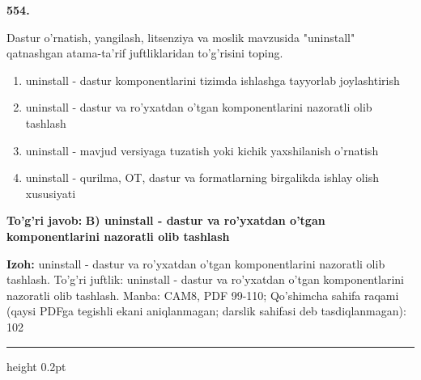 \documentclass[10pt,a4paper]{article}
\begin{document}
{\bfseries\sffamily\color{ink} 554.}
\par
Dastur o'rnatish, yangilash, litsenziya va moslik mavzusida "uninstall" qatnashgan atama-ta'rif juftliklaridan to'g'risini toping.
\begin{enumerate}[label=\Alph*),leftmargin=9mm]
\item uninstall - dastur komponentlarini tizimda ishlashga tayyorlab joylashtirish
\item uninstall - dastur va ro'yxatdan o'tgan komponentlarini nazoratli olib tashlash
\item uninstall - mavjud versiyaga tuzatish yoki kichik yaxshilanish o'rnatish
\item uninstall - qurilma, OT, dastur va formatlarning birgalikda ishlay olish xususiyati
\end{enumerate}
\begin{tcolorbox}[enhanced,breakable,colback=teal!4,colframe=teal!60!black,boxrule=0.45pt,arc=1.2mm,left=2.7mm,right=2.7mm,top=1.8mm,bottom=1.8mm,before skip=2mm,after skip=2mm]
{\bfseries\sffamily\color{teal}To'g'ri javob:} \textbf{B) uninstall - dastur va ro'yxatdan o'tgan komponentlarini nazoratli olib tashlash}
\par\smallskip
{\bfseries Izoh:} uninstall - dastur va ro'yxatdan o'tgan komponentlarini nazoratli olib tashlash. To'g'ri juftlik: uninstall - dastur va ro'yxatdan o'tgan komponentlarini nazoratli olib tashlash. Manba: CAM8, PDF 99-110; Qo'shimcha sahifa raqami (qaysi PDFga tegishli ekani aniqlanmagan; darslik sahifasi deb tasdiqlanmagan): 102
\end{tcolorbox}
\vspace{2mm}\hrule height 0.2pt\vspace{3mm}
\end{document}
